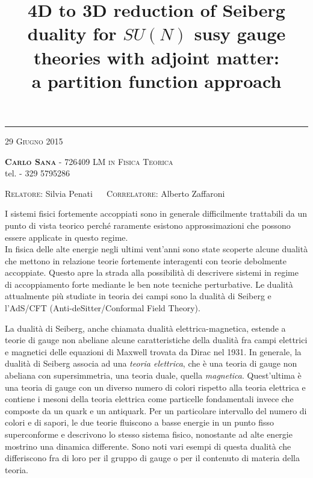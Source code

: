 \documentclass[a4paper,oneside,11pt]{article}
\date{}
\title{\boldmath \textbf{4D to 3D reduction of Seiberg duality for $SU(N)$ susy gauge theories with adjoint matter: \\  a partition function approach }
 }
\author{}
\begin{document}
\maketitle
\vspace*{-2.3cm}

\begin{center}
\rule{\textwidth}{0.5pt}
\scshape {29 Giugno 2015} \\
 \end{center}
\vspace{-0.3cm}
	 \textbf{\noindent%
	 \scshape%
	 Carlo Sana} - \textsf{726409}  \hfill
 {\scshape LM in Fisica Teorica} 
\\
 \noindent tel. \textsf{- 329 5795286}\\
 \vspace{-0.5cm}
\begin{center}
{ \scshape  Relatore}: 
\textsf{Silvia Penati} 
~~
{ \scshape  Correlatore}:
\textsf{Alberto Zaffaroni}

\end{center}

I sistemi fisici fortemente accoppiati sono in generale difficilmente trattabili da un punto di vista teorico perché raramente esistono approssimazioni che possono essere applicate in questo regime.\\
In fisica delle alte energie negli ultimi vent'anni sono state scoperte alcune dualità che mettono in relazione teorie fortemente interagenti con teorie debolmente accoppiate.
Questo apre la strada alla possibilità di descrivere sistemi in regime di accoppiamento forte mediante le ben note tecniche perturbative.
Le dualità attualmente più studiate in teoria dei campi sono la dualità di Seiberg e l'AdS/CFT (Anti-deSitter/Conformal Field Theory).

La dualità di Seiberg, anche chiamata dualità elettrica-magnetica, estende a teorie di gauge non abeliane alcune caratteristiche della dualità fra campi elettrici e magnetici delle equazioni di Maxwell trovata da Dirac nel 1931. 
In generale, la dualità di Seiberg associa ad una \emph{teoria elettrica}, che è una teoria di gauge non abeliana con supersimmetria, una teoria duale, quella \emph{magnetica}.
Quest'ultima è una teoria di gauge con un diverso numero di colori rispetto alla teoria elettrica e contiene i mesoni della teoria elettrica come particelle fondamentali invece che composte da un quark e un antiquark.
Per un particolare intervallo del numero di colori e di sapori, le due teorie fluiscono a basse energie in un punto fisso superconforme e descrivono lo stesso sistema fisico, nonostante ad alte energie mostrino una dinamica differente.
Sono noti vari esempi di questa dualità che differiscono fra di loro per il gruppo di gauge o per il contenuto di materia della teoria.
\end{document}
